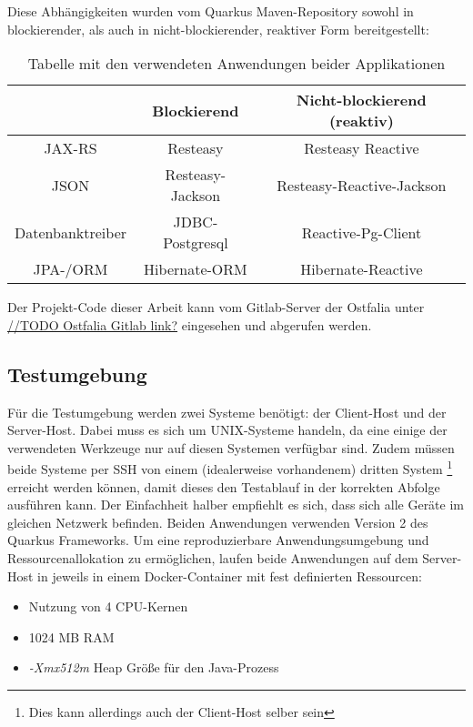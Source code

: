 Diese Abhängigkeiten wurden vom Quarkus Maven-Repository sowohl in blockierender,
als auch in nicht-blockierender, reaktiver Form bereitgestellt: \parencite{MavenQuarkusIO}
\setlength{\tabcolsep}{18pt}
\renewcommand{\arraystretch}{1.5}
\begin{table}[ht!]
    \centering
    \begin{tabular}{| c | c | c |}
        \hline
                         & Blockierend      & Nicht-blockierend (reaktiv) \\
        \hline
        JAX-RS           & Resteasy         & Resteasy Reactive           \\
        \hline
        JSON             & Resteasy-Jackson & Resteasy-Reactive-Jackson   \\
        \hline
        Datenbanktreiber & JDBC-Postgresql  & Reactive-Pg-Client          \\
        \hline
        JPA-/ORM         & Hibernate-ORM    & Hibernate-Reactive          \\
        \hline
    \end{tabular}
    \caption{Tabelle mit den verwendeten Anwendungen beider Applikationen}
    \label{table:dependencies}
\end{table}
Der Projekt-Code dieser Arbeit kann vom Gitlab-Server der Ostfalia unter
\url{//TODO Ostfalia Gitlab link?} eingesehen und abgerufen werden.
\subsection{Testumgebung}
\label{section:testumgebung}
Für die Testumgebung werden zwei Systeme benötigt: der Client-Host und der Server-Host.
Dabei muss es sich um UNIX-Systeme handeln, da eine einige der verwendeten Werkzeuge nur 
auf diesen Systemen verfügbar sind.
Zudem müssen beide Systeme per SSH von einem (idealerweise vorhandenem) dritten System 
\footnote{Dies kann allerdings auch der Client-Host selber sein} 
erreicht werden können, damit dieses den Testablauf in der korrekten Abfolge ausführen kann. 
Der Einfachheit halber empfiehlt es sich, dass sich alle Geräte im gleichen Netzwerk befinden.
Beiden Anwendungen verwenden Version 2 des Quarkus Frameworks. 
Um eine reproduzierbare Anwendungsumgebung und Ressourcenallokation zu ermöglichen, laufen beide Anwendungen auf dem Server-Host in
jeweils in einem Docker-Container mit fest definierten Ressourcen:
\begin{itemize}
    \item Nutzung von 4 CPU-Kernen
    \item 1024 MB RAM
    \item \textit{-Xmx512m} Heap Größe für den Java-Prozess
\end{itemize}

